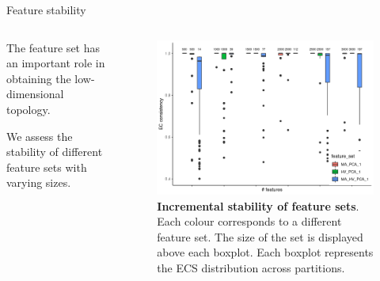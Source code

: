 \begin{frame}{Feature stability}
    \begin{columns}
        \begin{column}{0.45\textwidth}
            \justifying

            The feature set has an important role in obtaining the low-dimensional topology.
            \bigskip


            We assess the stability of different feature sets with varying sizes.
            \bigskip


        \end{column}

        \begin{column}{0.5\textwidth}
            \begin{figure}
                \centering
                \includegraphics[width=\textwidth]{images/ch3/3_feat_incremental.png}
                \caption{\justifying \textbf{Incremental stability of feature sets}. Each colour corresponds to a different feature set. The size of the set is displayed above each boxplot. Each boxplot represents the ECS distribution across partitions.}
            \end{figure}
        \end{column}
    \end{columns}
\end{frame}

